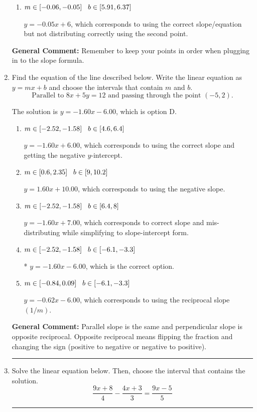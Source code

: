 \documentclass{extbook}[14pt]
\newcommand{\litem}[1]{\item #1

\rule{\textwidth}{0.4pt}}
\begin{document}
\begin{enumerate}
{\begin{enumerate}[label=\Alph*.]
 $y = 0.05x -4.45$, which corresponds to using the negative slope and the correct equation.
\item \( m \in [-0.06, -0.05] \hspace*{3mm} b \in [5.91, 6.37] \)

 $y = -0.05x + 6$, which corresponds to using the correct slope/equation but not distributing correctly using the second point.
\end{enumerate}

\textbf{General Comment:} Remember to keep your points in order when plugging in to the slope formula.
}
\litem{
Find the equation of the line described below. Write the linear equation as $ y=mx+b $ and choose the intervals that contain $m$ and $b$.
\[ \text{Parallel to } 8 x + 5 y = 12 \text{ and passing through the point } (-5, 2). \]

The solution is \( y = -1.60x - 6.00 \), which is option D.\begin{enumerate}[label=\Alph*.]
\item \( m \in [-2.52, -1.58] \hspace*{3mm} b \in [4.6, 6.4] \)

 $y = -1.60x + 6.00$, which corresponds to using the correct slope and getting the negative $y$-intercept.
\item \( m \in [0.6, 2.35] \hspace*{3mm} b \in [9, 10.2] \)

 $y = 1.60x + 10.00$, which corresponds to using the negative slope.
\item \( m \in [-2.52, -1.58] \hspace*{3mm} b \in [6.4, 8] \)

 $y = -1.60x + 7.00$, which corresponds to correct slope and mis-distributing while simplifying to slope-intercept form.
\item \( m \in [-2.52, -1.58] \hspace*{3mm} b \in [-6.1, -3.3] \)

* $y = -1.60x - 6.00$, which is the correct option.
\item \( m \in [-0.84, 0.09] \hspace*{3mm} b \in [-6.1, -3.3] \)

 $y = -0.62x - 6.00$, which corresponds to using the reciprocal slope $(1/m)$.
\end{enumerate}

\textbf{General Comment:} Parallel slope is the same and perpendicular slope is opposite reciprocal. Opposite reciprocal means flipping the fraction and changing the sign (positive to negative or negative to positive).
}
\litem{
Solve the linear equation below. Then, choose the interval that contains the solution.
\[ \frac{9x + 8}{4} - \frac{4x + 3}{3} = \frac{9x -5}{5} \]

}
\end{enumerate}
\end{document}
